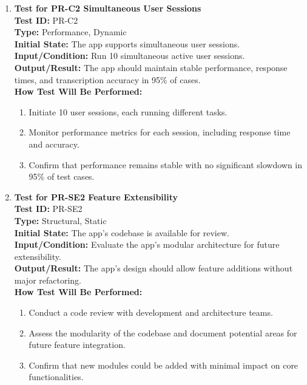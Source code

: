 \documentclass[12pt, titlepage]{article}
\begin{document}
\begin{enumerate}
    \item \textbf{Test for PR-C2 Simultaneous User Sessions} \\
      \newline
      \textbf{Test ID:} PR-C2 \\
      \textbf{Type:} Performance, Dynamic \\
      \textbf{Initial State:} The app supports simultaneous user sessions. \\
      \textbf{Input/Condition:} Run 10 simultaneous active user sessions. \\
      \textbf{Output/Result:} The app should maintain stable performance, response times, and transcription accuracy in 95\% of cases. \\
      \textbf{How Test Will Be Performed:}
      \begin{enumerate}
          \item Initiate 10 user sessions, each running different tasks.
          \item Monitor performance metrics for each session, including response time and accuracy.
          \item Confirm that performance remains stable with no significant slowdown in 95\% of test cases.
      \end{enumerate}

    \item \textbf{Test for PR-SE2 Feature Extensibility} \\
      \newline
      \textbf{Test ID:} PR-SE2 \\
      \textbf{Type:} Structural, Static \\
      \textbf{Initial State:} The app’s codebase is available for review. \\
      \textbf{Input/Condition:} Evaluate the app’s modular architecture for future extensibility. \\
      \textbf{Output/Result:} The app’s design should allow feature additions without major refactoring. \\
      \textbf{How Test Will Be Performed:}
      \begin{enumerate}
          \item Conduct a code review with development and architecture teams.
          \item Assess the modularity of the codebase and document potential areas for future feature integration.
          \item Confirm that new modules could be added with minimal impact on core functionalities.
      \end{enumerate}


\end{enumerate}
\end{document}
